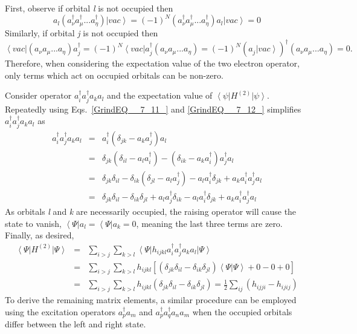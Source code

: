 \documentclass[11pt,oneside,final]{huthesis}%
\begin{document}
First, observe if orbital \textit{l} is not occupied then 
\[a_{l} \left(a_{\nu }^{\dag } a_{\mu }^{\dag } ...a_{\eta }^{\dag } \right){\left| vac \right\rangle} =(-1)^{N} \left(a_{\nu }^{\dag } a_{\mu }^{\dag } ...a_{\eta }^{\dag } \right)a_{l} {\left| vac \right\rangle} =0\] 
Similarly, if orbital \textit{j} is not occupied then 
\[{\left\langle vac \right|} \left(a_{\nu }^{} a_{\mu }^{} ...a_{\eta }^{} \right)a_{j}^{\dag } =(-1)^{N} {\left\langle vac \right|} a_{j}^{\dag } \left(a_{\nu }^{} a_{\mu }^{} ...a_{\eta }^{} \right)=(-1)^{N} \left(a_{j}^{} {\left| vac \right\rangle} \right)^{\dag } \left(a_{\nu }^{} a_{\mu }^{} ...a_{\eta }^{} \right)=0.\] 
Therefore, when considering the expectation value of the two electron operator, only terms which act on occupied orbitals can be non-zero.  

Consider operator $a_{i}^{\dag } a_{j}^{\dag } a_{k} a_{l}$ and the expectation value of ${\left\langle \psi  \right|} H^{(2)} {\left| \psi  \right\rangle}$. Repeatedly using Eqs.~\eqref{GrindEQ__7_11_} and \eqref{GrindEQ__7_12_} simplifies $a_{i}^{\dag } a_{j}^{\dag } a_{k} a_{l}$ as
\begin{eqnarray*} \label{GrindEQ__7_15_} 
a_{i}^{\dag } a_{j}^{\dag } a_{k} a_{l} & =&a_{i}^{\dag } \left(\delta _{jk} -a_{k} a_{j}^{\dag } \right)a_{l} \\
&=&\delta _{jk} \left(\delta _{il} -a_{l} a_{i}^{\dag } \right)-\left(\delta _{ik} -a_{k} a_{i}^{\dag } \right)a_{j}^{\dag } a_{l}  \\ 
& =&\delta _{jk} \delta _{il} -\delta _{ik} \left(\delta _{jl} -a_{l} a_{j}^{\dag } \right)-a_{l} a_{i}^{\dag } \delta _{jk} +a_{k} a_{i}^{\dag } a_{j}^{\dag } a_{l}  \\ 
& =&\delta _{jk} \delta _{il} -\delta _{ik} \delta _{jl} +a_{l} a_{j}^{\dag } \delta _{ik} -a_{l} a_{i}^{\dag } \delta _{jk} +a_{k} a_{i}^{\dag } a_{j}^{\dag } a_{l} 
\end{eqnarray*} 
As orbitals \textit{l} and \textit{k} are necessarily occupied, the raising operator will cause the state to vanish, ${\left\langle \Psi  \right|} a_{l} ={\left\langle \Psi  \right|} a_{k} =0$, meaning the last three terms are zero.  Finally, as desired,
\begin{eqnarray} \label{GrindEQ__7_16_} 
 \left\langle \Psi  \right| H^{(2)} {\left| \Psi  \right\rangle} & =&\sum _{i>j}\sum_{k>l}{\left\langle \Psi  \right|} h_{ijkl} a_{i}^{\dag } a_{j}^{\dag } a_{k} a_{l}  {\left| \Psi  \right\rangle} \nonumber\\ 
 &=&\sum _{i>j}\sum_{k>l} h_{ijkl} \left[\left(\delta _{jk} \delta _{il} -\delta_{ik} \delta _{jl} \right){\left\langle \Psi |\Psi  \right\rangle} +0-0+0\right]  \nonumber\\ 
 &=&\sum _{i>j}\sum_{k>l} h_{ijkl}  \left(\delta _{jk} \delta _{il} -\delta _{ik} \delta _{jl} \right)=\frac{1}{2}\sum _{ij}(h_{ijji} -h_{ijij})  
\end{eqnarray} 
To derive the remaining matrix elements, a similar procedure can be employed using the excitation operators $a_{p}^{\dag } a_{m} $ and $a_{p}^{\dag } a_{q}^{\dag } a_{n} a_{m} $ when the occupied orbitals differ between the left and right state.
\end{document}

